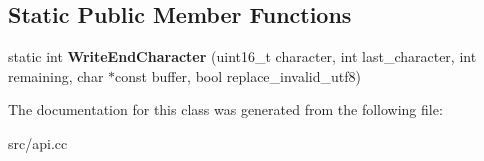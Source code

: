 \subsection*{Static Public Member Functions}
\begin{DoxyCompactItemize}
\item 
\hypertarget{classv8_1_1_utf8_writer_visitor_a2eebbdadedbf85598f175196b22cfe48}{}static int {\bfseries Write\+End\+Character} (uint16\+\_\+t character, int last\+\_\+character, int remaining, char $\ast$const buffer, bool replace\+\_\+invalid\+\_\+utf8)\label{classv8_1_1_utf8_writer_visitor_a2eebbdadedbf85598f175196b22cfe48}

\end{DoxyCompactItemize}


The documentation for this class was generated from the following file\+:\begin{DoxyCompactItemize}
\item 
src/api.\+cc\end{DoxyCompactItemize}
